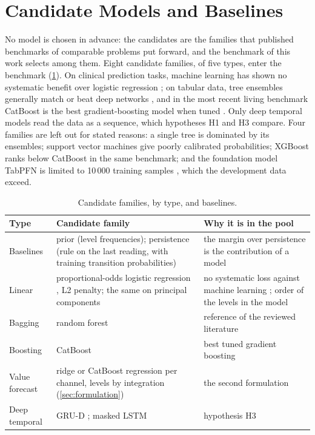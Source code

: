\section{Candidate Models and Baselines}\label{sec:ml}\label{sec:families}\label{sec:baselines}

No model is chosen in advance: the candidates are the families that published benchmarks of comparable problems put forward, and the benchmark of this work selects among them. Eight candidate families, of five types, enter the benchmark (\cref{tab:candidates}). On clinical prediction tasks, machine learning has shown no systematic benefit over logistic regression \parencite{christodoulou2019}; on tabular data, tree ensembles generally match or beat deep networks \parencite{grinsztajn2022}, and in the most recent living benchmark CatBoost is the best gradient-boosting model when tuned \parencite{erickson2025}. Only deep temporal models read the data as a sequence, which hypotheses H1 and H3 compare. Four families are left out for stated reasons: a single tree is dominated by its ensembles; support vector machines give poorly calibrated probabilities; XGBoost ranks below CatBoost in the same benchmark; and the foundation model TabPFN is limited to 10\,000 training samples \parencite{hollmann2025}, which the development data exceed.

\begin{table}[htbp]
\centering\footnotesize
\caption{Candidate families, by type, and baselines.}\label{tab:candidates}
\begin{tabularx}{\textwidth}{@{}>{\raggedright\arraybackslash}p{2.4cm} >{\raggedright\arraybackslash}p{4.4cm} X@{}}
\toprule
\textbf{Type} & \textbf{Candidate family} & \textbf{Why it is in the pool} \\
\midrule
Baselines & prior (level frequencies); persistence (rule on the last reading, with training transition probabilities) & the margin over persistence is the contribution of a model \\
Linear & proportional-odds logistic regression \parencite{mccullagh1980}, L2 penalty; the same on principal components & no systematic loss against machine learning \parencite{christodoulou2019}; order of the levels in the model \\
Bagging & random forest \parencite{breiman2001} & reference of the reviewed literature \parencite{mendoza2025} \\
Boosting & CatBoost \parencite{prokhorenkova2018} & best tuned gradient boosting \parencite{erickson2025} \\
Value forecast & ridge or CatBoost regression per channel, levels by integration (\cref{sec:formulation}) & the second formulation \\
Deep temporal & GRU-D \parencite{che2018}; masked LSTM \parencite{hochreiter1997} & hypothesis H3 \\
\bottomrule
\end{tabularx}
\end{table}

